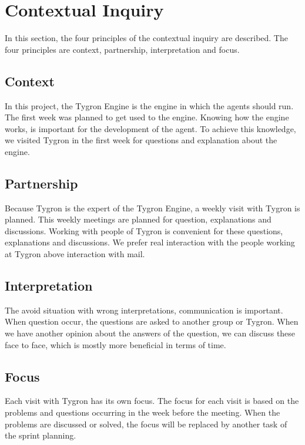 \documentclass[11pt,a4paper]{article}
\begin{document}
\newpage

\section{Contextual Inquiry}
In this section, the four principles of the contextual inquiry are described. The four principles are context, partnership, interpretation and focus.

\subsection{Context}
In this project, the Tygron Engine is the engine in which the agents should run. The first week was planned to get used to the engine. Knowing how the engine works, is important for the development of the agent. To achieve this knowledge, we visited Tygron in the first week for questions and explanation about the engine.  

\subsection{Partnership}
Because Tygron is the expert of the Tygron Engine, a weekly visit with Tygron is planned. This weekly meetings are planned for question, explanations and discussions. Working with people of Tygron is convenient for these questions, explanations and discussions. We prefer real interaction with the people working at Tygron above interaction with mail.

\subsection{Interpretation}
The avoid situation with wrong interpretations, communication is important. When question occur, the questions are asked to another group or Tygron. When we have another opinion about the answers of the question, we can discuss these face to face, which is mostly more beneficial in terms of time. 

\subsection{Focus}
Each visit with Tygron has its own focus. The focus for each visit is based on the problems and questions occurring in the week before the meeting. When the problems are discussed or solved, the focus will be replaced by another task of the sprint planning. 

\newpage
\end{document}
